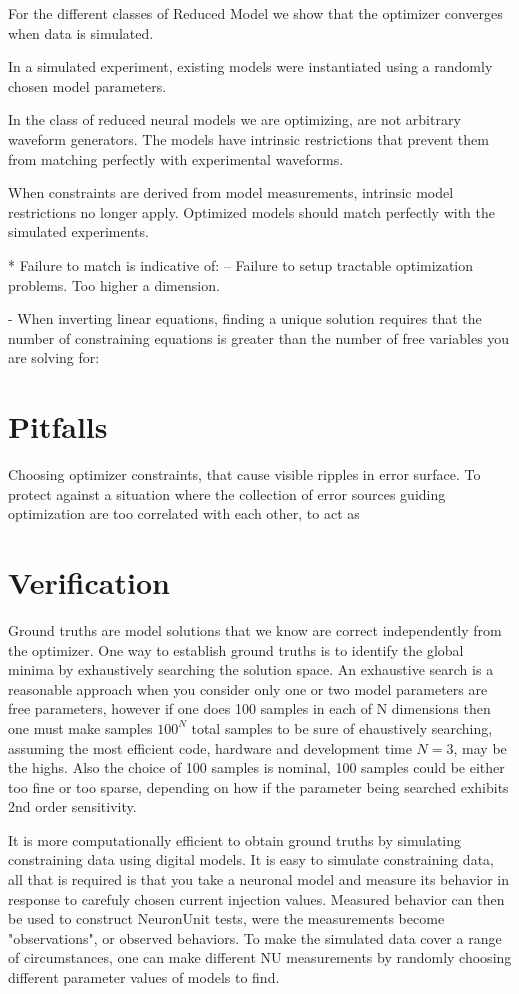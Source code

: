 For the different classes of Reduced Model we show that the optimizer converges when data is simulated.

In a simulated experiment, existing models were instantiated using a randomly chosen model parameters.

In the class of reduced neural models we are optimizing, are not arbitrary waveform generators. The models have intrinsic restrictions that prevent them from matching perfectly with experimental waveforms.

When constraints are derived from model measurements, intrinsic model restrictions no longer apply. Optimized models should match perfectly with the simulated experiments. 

* Failure to match is indicative of: -- Failure to setup tractable optimization problems. Too higher a dimension.

- When inverting linear equations, finding a unique solution requires that the number of constraining equations is greater than the number of free variables you are solving for:

\section{Pitfalls}
Choosing optimizer constraints, that cause visible ripples in error surface.
To protect against a situation where the collection of error sources guiding optimization are too correlated with each other, to act as 


\section{Verification}
Ground truths are model solutions that we know are correct independently from the optimizer. One way to establish ground truths is to identify the global minima by exhaustively searching the solution space. An exhaustive search is a reasonable approach when you consider only one or two model parameters are free parameters, however if one does 100 samples in each of N dimensions then one must make samples $100^{N}$ total samples to be sure of ehaustively searching, assuming the most efficient code, hardware and development time $N=3$, may be the highs.  Also the choice of 100 samples is nominal, 100 samples could be either too fine or too sparse, depending on how if the parameter being searched exhibits 2nd order sensitivity.

It is more computationally efficient to obtain ground truths by simulating constraining data using digital models. It is easy to simulate constraining data, all that is required is that you take a neuronal model and measure its behavior in response to carefuly chosen current injection values. Measured behavior can then be used to construct NeuronUnit tests, were the measurements become "observations", or observed behaviors. To make the simulated data cover a range of circumstances, one can make different NU measurements by randomly choosing different parameter values of models to find.

